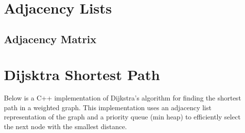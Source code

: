 \section{Adjacency Lists}

\subsection{Adjacency Matrix}




\section{Dijsktra Shortest Path}

Below is a C++ implementation of Dijkstra's algorithm for finding the shortest path in a weighted graph.
This implementation uses an adjacency list representation of the graph
and a priority queue (min heap) to efficiently select the next node with the smallest distance.


